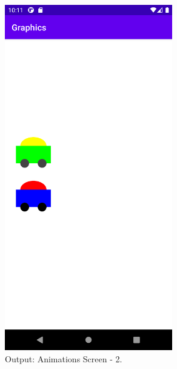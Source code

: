 \documentclass[12pt, a4]{article}
\begin{document}
\subsection*{}
\begin{figure}[h]
\centering
\caption{Output: Animations Screen - 2.}
\includegraphics[height=15cm, width=7.3cm]{Graphics/Screenshots/Graphics-4.png}
\end{figure}

\newpage
\end{document}
